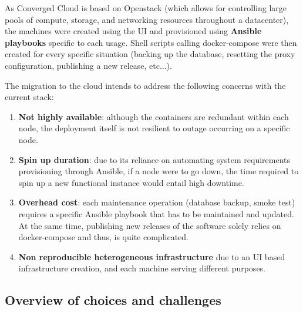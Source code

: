 \documentclass[11pt]{article}
\begin{document}
\vspace{2mm}
As Converged Cloud is based on Openstack (which allows for controlling large pools of compute, storage, and networking resources throughout a datacenter), the machines were created using the UI and provisioned using \textbf{Ansible playbooks} specific to each usage. Shell scripts calling docker-compose were then created for every specific situation (backing up the database, resetting the proxy configuration, publishing a new release, etc...).

The migration to the cloud intends to address the following concerns with the current stack: \label{sec:obj}
\begin{enumerate}
    \item \textbf{Not highly available}: \label{obj:dep_ha} although the containers are redundant within each node, the deployment itself is not resilient to outage occurring on a specific node.
    \item \textbf{Spin up duration}: \label{obj:dep_spin} due to its reliance on automating system requirements provisioning through Ansible, if a node were to go down, the time required to spin up a new functional instance would entail high downtime.
    \item \textbf{Overhead cost}: \label{obj:dep_overhead} each maintenance operation (database backup, smoke test) requires a specific Ansible playbook that has to be maintained and updated. At the same time, publishing new releases of the software solely relies on docker-compose and thus, is quite complicated.
    \item \textbf{Non reproducible heterogeneous infrastructure} \label{obj:dep_reprod} due to an UI based infrastructure creation, and each machine serving different purposes.
\end{enumerate}

\subsection{Overview of choices and challenges}
\end{document}
